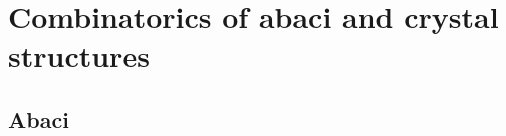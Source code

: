 \documentclass[12pt]{amsart}
\numberwithin{equation}{section}
\theoremstyle{definition}
\begin{document}


\section{Combinatorics of abaci and crystal structures}\label{abaci+crystals}
\subsection{Abaci}\label{abaci}
\end{document}

